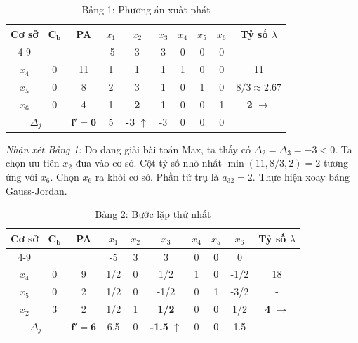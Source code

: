 \begin{table}[htbp]
    \centering
    \renewcommand{\arraystretch}{1.3}
    \begin{tabular}{|c|c|c|c|c|c|c|c|c|c|}
        \hline
        \multirow{2}{*}{\textbf{Cơ sở}} & \multirow{2}{*}{$\mathbf{C_b}$} & \multirow{2}{*}{\textbf{PA}} & $x_1$ & $x_2$ & $x_3$ & $x_4$ & $x_5$ & $x_6$ & \multirow{2}{*}{\textbf{Tỷ số $\lambda$}} \\
        \cline{4-9}
        & & & -5 & 3 & 3 & 0 & 0 & 0 & \\
        \hline
        $x_4$ & 0 & 11 & 1 & 1 & 1 & 1 & 0 & 0 & 11 \\
        \hline
        $x_5$ & 0 & 8 & 2 & 3 & 1 & 0 & 1 & 0 & $8/3 \approx 2.67$ \\
        \hline
        $x_6$ & 0 & 4 & 1 & \textbf{2} & 1 & 0 & 0 & 1 & \textbf{2} $\rightarrow$ \\
        \hline
        \multicolumn{2}{|c|}{$\Delta_j$} & $\mathbf{f' = 0}$ & 5 & \textbf{-3} $\uparrow$ & -3 & 0 & 0 & 0 & \\
        \hline
    \end{tabular}
    \caption{Bảng 1: Phương án xuất phát}
\end{table}

\textit{Nhận xét Bảng 1:} Do đang giải bài toán Max, ta thấy có $\Delta_2 = \Delta_3 = -3 < 0$. Ta chọn ưu tiên $x_2$ đưa vào cơ sở. Cột tỷ số nhỏ nhất $\min(11, 8/3, 2) = 2$ tương ứng với $x_6$. Chọn $x_6$ ra khỏi cơ sở. Phần tử trụ là $a_{32} = 2$. Thực hiện xoay bảng Gauss-Jordan.

\begin{table}[htbp]
    \centering
    \renewcommand{\arraystretch}{1.3}
    \begin{tabular}{|c|c|c|c|c|c|c|c|c|c|}
        \hline
        \multirow{2}{*}{\textbf{Cơ sở}} & \multirow{2}{*}{$\mathbf{C_b}$} & \multirow{2}{*}{\textbf{PA}} & $x_1$ & $x_2$ & $x_3$ & $x_4$ & $x_5$ & $x_6$ & \multirow{2}{*}{\textbf{Tỷ số $\lambda$}} \\
        \cline{4-9}
        & & & -5 & 3 & 3 & 0 & 0 & 0 & \\
        \hline
        $x_4$ & 0 & 9 & 1/2 & 0 & 1/2 & 1 & 0 & -1/2 & 18 \\
        \hline
        $x_5$ & 0 & 2 & 1/2 & 0 & -1/2 & 0 & 1 & -3/2 & - \\
        \hline
        $x_2$ & 3 & 2 & 1/2 & 1 & \textbf{1/2} & 0 & 0 & 1/2 & \textbf{4} $\rightarrow$ \\
        \hline
        \multicolumn{2}{|c|}{$\Delta_j$} & $\mathbf{f' = 6}$ & 6.5 & 0 & \textbf{-1.5} $\uparrow$ & 0 & 0 & 1.5 & \\
        \hline
    \end{tabular}
    \caption{Bảng 2: Bước lặp thứ nhất}
\end{table}

